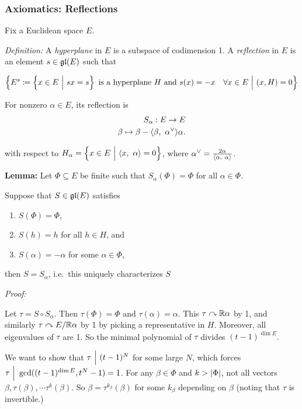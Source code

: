 \hypertarget{axiomatics-reflections}{%
\subsubsection{Axiomatics: Reflections}\label{axiomatics-reflections}}

Fix a Euclidean space \(E\).

\emph{Definition:} A \emph{hyperplane} in \(E\) is a subspace of
codimension 1. A \emph{reflection} in \(E\) is an element
\(s\in {\mathfrak{gl}}(E)\) such that

\[
\left\{{
E^s \coloneqq \left\{{x\in E {~\mathrel{\Big|}~} sx = s}\right\} \text{ is a hyperplane } H \text{ and } s(x) = -x\quad \forall x\in E {~\mathrel{\Big|}~} (x, H) = 0
}\right\}\]

For nonzero \(\alpha\in E\), its reflection is \begin{align*}
S_\alpha: E \to E \\
\beta \mapsto \beta - {\left\langle {\beta},~{\alpha^\vee} \right\rangle}\alpha
.\end{align*}

with respect to
\(H_\alpha = \left\{{x\in E {~\mathrel{\Big|}~} {\left\langle {x},~{\alpha} \right\rangle} = 0}\right\}\), where
\(\alpha^\vee = \frac{2\alpha}{{\left\langle {\alpha},~{\alpha} \right\rangle}}\).

\textbf{Lemma:} Let \(\Phi \subseteq E\) be finite such that
\(S_\alpha(\Phi) = \Phi\) for all \(\alpha \in \Phi\).

Suppose that \(S \in {\mathfrak{gl}}(E)\) satisfies

\begin{enumerate}
\def\labelenumi{\arabic{enumi}.}
\tightlist
\item
  \(S(\Phi) = \Phi\),
\item
  \(S(h) = h\) for all \(h\in H\), and
\item
  \(S(\alpha) = -\alpha\) for some \(\alpha \in \Phi\),
\end{enumerate}

then \(S = S_\alpha\), i.e.~this uniquely characterizes \(S\)

\emph{Proof:}

Let \(\tau = S \circ S_\alpha\). Then \(\tau(\Phi) = \Phi\) and
\(\tau(\alpha) = \alpha\). This \(\tau \curvearrowright {\mathbb{R}}\alpha\) by 1, and
similarly \(\tau \curvearrowright E/{\mathbb{R}}\alpha\) by 1 by picking a representative
in \(H\). Moreover, all eigenvalues of \(\tau\) are 1. So the minimal
polynomial of \(\tau\) divides \((t-1)^{\dim E}\).

We want to show that \(\tau {~\Bigm| ~} (t-1)^N\) for some large \(N\),
which forces \(\tau {~\Bigm| ~} \gcd((t-1)^{\dim E}, t^N - 1) = 1\). For
any \(\beta \in \Phi\) and \(k > {\left\lvert {\Phi} \right\rvert}\), not all vectors
\(\beta, \tau(\beta), \cdots \tau^k(\beta)\). So
\(\beta = \tau^{k_\beta}(\beta)\) for some \(k_\beta\) depending on
\(\beta\) (noting that \(\tau\) is invertible.)

